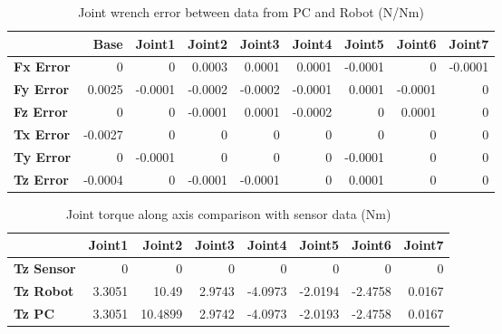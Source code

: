 \begin{table}[h!]
	\centering
	\caption{Joint wrench error between data from PC and Robot (N/Nm)}
	\label{wrech_Error_Pose9}
	\begin{tabular}{|l|r|r|r|r|r|r|r|r|}
		\hline
		\textbf{}  & \textbf{Base} & \textbf{Joint1}  & \textbf{Joint2}  & \textbf{Joint3}  & \textbf{Joint4}  & \textbf{Joint5}  & \textbf{Joint6}  & \textbf{Joint7} \\ \hline
		\textbf{Fx Error}  & 0        & 0        & 0.0003        & 0.0001        & 0.0001        & -0.0001        & 0        & -0.0001 \\ \hline
		\textbf{Fy Error}  & 0.0025        & -0.0001        & -0.0002        & -0.0002        & -0.0001        & 0.0001        & -0.0001        & 0 \\ \hline
		\textbf{Fz Error}  & 0        & 0        & -0.0001        & 0.0001        & -0.0002        & 0        & 0.0001        & 0 \\ \hline
		\textbf{Tx Error}  & -0.0027        & 0        & 0        & 0        & 0        & 0        & 0        & 0 \\ \hline
		\textbf{Ty Error}  & 0        & -0.0001        & 0        & 0        & 0        & -0.0001        & 0        & 0 \\ \hline
		\textbf{Tz Error}  & -0.0004        & 0        & -0.0001        & -0.0001        & 0        & 0.0001        & 0        & 0 \\ \hline
	\end{tabular}
\end{table}

\begin{table}[h!]
	\centering
	\caption{Joint torque along axis comparison with sensor data (Nm)}
	\label{wrech_Sensor_Pose9}
	\begin{tabular}{|l|r|r|r|r|r|r|r|}
		\hline
		\textbf{} & \textbf{Joint1} & \textbf{Joint2} & \textbf{Joint3} & \textbf{Joint4} & \textbf{Joint5} & \textbf{Joint6} & \textbf{Joint7} \\ \hline
		\textbf{Tz Sensor}  & 0           & 0           & 0            & 0           & 0           & 0           & 0           \\ \hline
		\textbf{Tz Robot}  	& 3.3051           & 10.49           & 2.9743            & -4.0973           & -2.0194           & -2.4758           & 0.0167           \\ \hline
		\textbf{Tz PC}  	& 3.3051           & 10.4899           & 2.9742            & -4.0973           & -2.0193           & -2.4758           & 0.0167           \\ \hline
	\end{tabular}
\end{table}

